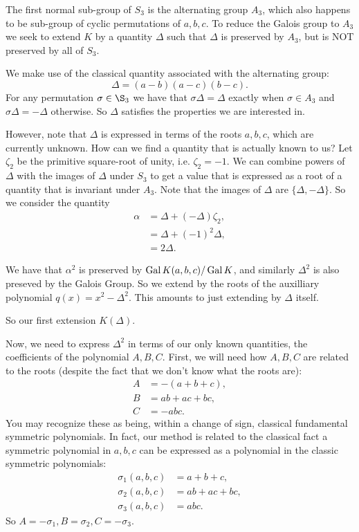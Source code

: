 The first normal sub-group of \(S_3\) is the alternating group \(A_3\), which also happens to be sub-group of
cyclic permutations of \(a, b, c\). To reduce the Galois group to \(A_3\) we seek to extend \(K\) by a quantity
\(\Delta\) such that \(\Delta\) is preserved by \(A_3\), but is NOT preserved by all of \(S_3\).

We make use of the classical quantity associated with the alternating group:
\begin{equation}
\Delta = (a - b)(a - c)(b - c).
\end{equation}
For any permutation \(\sigma\in\S_3\) we have that \(\sigma \Delta = \Delta\) exactly when \(\sigma \in A_3\) and
\(\sigma \Delta = - \Delta\) otherwise. So \(\Delta\) satisfies the properties we are interested in.

However, note that \(\Delta\) is expressed in terms of the roots \(a, b, c\), which are currently unknown. How
can we find a quantity that is actually known to us? Let \(\zeta_2\) be the primitive square-root of unity, i.e.
\(\zeta_2 = -1\). We can combine powers of \(\Delta\) with the images of \(\Delta\) under \(S_3\) to get
a value that is expressed as a root of a quantity that is invariant under \(A_3\). Note that the images of
\(\Delta\) are \(\{\Delta, -\Delta\}\). So we consider the quantity
\begin{align}
\alpha & = \Delta + (-\Delta)\zeta_2, \\
    & = \Delta + (-1)^2 \Delta, \\
    & = 2\Delta.
\end{align}

We have that \(\alpha^2\) is preserved by \(\operatorname{Gal} K(a, b, c) / \operatorname{Gal} K\), and similarly \(\Delta^2\) is also
preseved by the Galois Group. So we extend by the roots of the auxilliary polynomial \(q(x) = x^2 - \Delta^2\).
This amounts to just extending by \(\Delta\) itself.

So our first extension \(K(\Delta)\).

Now, we need to express \(\Delta^2\) in terms of our only known quantities, the coefficients of the polynomial
\(A, B, C\). First, we will need how \(A, B, C\) are related to the roots 
(despite the fact that we don't know what the roots are):
\begin{align}
A & = -(a + b + c), \\
B & = ab + ac + bc, \\
C & = -abc.
\end{align}
You may recognize these as being, within a change of sign, classical fundamental symmetric polynomials.
In fact, our method is related
to the classical fact a symmetric polynomial in \(a, b, c\) can be expressed as a polynomial in the classic
symmetric polynomials:
\begin{align}
\sigma_1(a, b, c) & = a + b + c, \\
\sigma_2(a, b, c) & = ab + ac + bc, \\
\sigma_3(a, b, c) & = abc.
\end{align}
So \(A = -\sigma_1, B = \sigma_2, C = -\sigma_3\).

